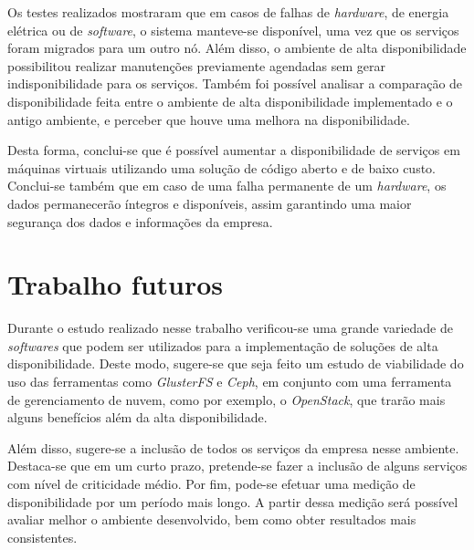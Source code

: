 Os testes realizados mostraram que em casos de falhas de \textit{hardware}, de energia elétrica ou de \textit{software}, o sistema manteve-se
disponível, uma vez que os serviços foram migrados para um outro nó. Além disso, o ambiente de alta disponibilidade possibilitou
realizar manutenções previamente agendadas sem gerar indisponibilidade para os serviços.
Também foi possível analisar a comparação de disponibilidade feita entre o ambiente de alta disponibilidade implementado e o antigo ambiente,
e perceber que houve uma melhora na disponibilidade.

Desta forma, conclui-se que é possível aumentar a disponibilidade de serviços em máquinas virtuais utilizando uma solução 
de código aberto e de baixo custo.
Conclui-se também que em caso de uma falha permanente de um \textit{hardware}, os dados permanecerão íntegros e disponíveis, assim garantindo 
uma maior segurança dos dados e informações da empresa.

\section{Trabalho futuros}
\label{section:trabalhosfuturos}

Durante o estudo realizado nesse trabalho verificou-se uma grande variedade de \textit{softwares} que podem ser utilizados para a implementação 
de soluções de alta disponibilidade. Deste modo, sugere-se que seja feito um estudo de viabilidade do uso das ferramentas como \textit{GlusterFS} 
e \textit{Ceph}, em conjunto com uma ferramenta de gerenciamento de nuvem, como por exemplo, o \textit{OpenStack}, que trarão mais alguns 
benefícios além da alta disponibilidade.

Além disso, sugere-se a inclusão de todos os serviços da empresa nesse ambiente. Destaca-se que em um curto prazo, pretende-se fazer a inclusão 
de alguns serviços com nível de criticidade médio. Por fim, pode-se efetuar uma medição de disponibilidade por um período mais longo. A partir
dessa medição será possível avaliar melhor o ambiente desenvolvido, bem como obter resultados mais consistentes.
